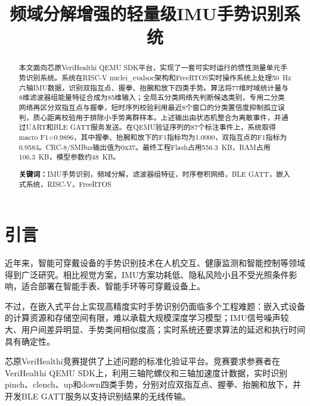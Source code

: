 \documentclass[lettersize,journal]{IEEEtran}
\begin{document}
\title{频域分解增强的轻量级IMU手势识别系统}

\author{
}

\maketitle

\begin{abstract}
本文面向芯原VeriHealthi QEMU SDK平台，实现了一套可实时运行的惯性测量单元手势识别系统。系统在RISC-V nuclei\_evalsoc架构和FreeRTOS实时操作系统上处理50~Hz六轴IMU数据，识别双指互点、握拳、抬腕和放下四类手势。算法将77维时域统计量与8维滤波器组能量特征合成为85维输入；全局五分类网络先判断候选类别，专用二分类网络再区分双指互点与握拳，短时序列校验利用最近8个窗口的分类置信度抑制孤立误判，质心距离校验用于排除小手势离群样本。上述输出由状态机整合为离散事件，并通过UART和BLE GATT服务发送。在QEMU验证序列的87个标注事件上，系统取得macro F1=0.9896，其中握拳、抬腕和放下的F1指标均为1.0000，双指互点的F1指标为0.9583。CRC-8/SMBus输出值为0x37。最终工程Flash占用556.3~KB，RAM占用106.3~KB，模型参数约48~KB。

\vspace{1em}
\noindent\textbf{关键词：}IMU手势识别，频域分解，滤波器组特征，时序卷积网络，BLE GATT，嵌入式系统，RISC-V，FreeRTOS
\end{abstract}

\IEEEpeerreviewmaketitle

\section{引言}
\label{sec:introduction}

近年来，智能可穿戴设备的手势识别技术在人机交互、健康监测和智能控制等领域得到广泛研究\cite{bulling2014tutorial,xu2022enabling,laput2019sensing}。相比视觉方案，IMU方案功耗低、隐私风险小且不受光照条件影响，适合部署在智能手表、智能手环等可穿戴设备上。

不过，在嵌入式平台上实现高精度实时手势识别仍面临多个工程难题：嵌入式设备的计算资源和存储空间有限，难以承载大规模深度学习模型；IMU信号噪声较大、用户间差异明显、手势类间相似度高；实时系统还要求算法的延迟和执行时间具有确定性。

芯原VeriHealthi竞赛提供了上述问题的标准化验证平台。竞赛要求参赛者在VeriHealthi QEMU SDK上，利用三轴陀螺仪和三轴加速度计数据，实时识别pinch、clench、up和down四类手势，分别对应双指互点、握拳、抬腕和放下，并开发BLE GATT服务以支持识别结果的无线传输。
\end{document}
